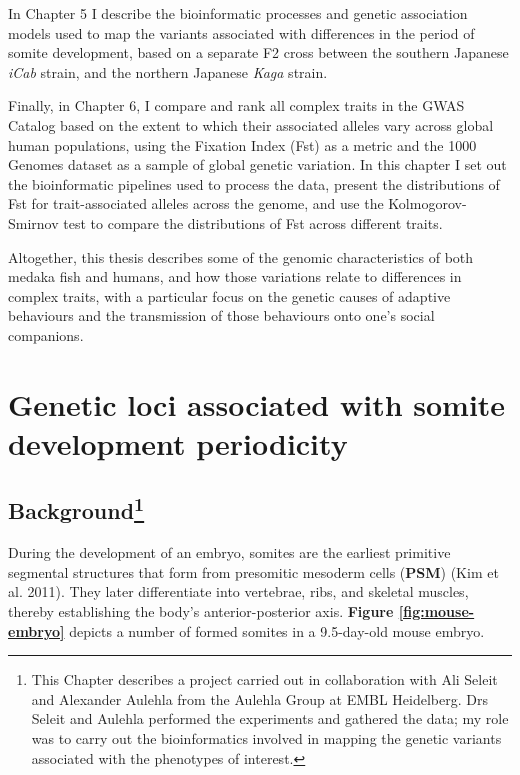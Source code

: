 \documentclass[
]{book}
\begin{document}
In Chapter 5 I describe the bioinformatic processes and genetic association models used to map the variants associated with differences in the period of somite development, based on a separate F2 cross between the southern Japanese \emph{iCab} strain, and the northern Japanese \emph{Kaga} strain.

Finally, in Chapter 6, I compare and rank all complex traits in the GWAS Catalog based on the extent to which their associated alleles vary across global human populations, using the Fixation Index (Fst) as a metric and the 1000 Genomes dataset as a sample of global genetic variation. In this chapter I set out the bioinformatic pipelines used to process the data, present the distributions of Fst for trait-associated alleles across the genome, and use the Kolmogorov-Smirnov test to compare the distributions of Fst across different traits.

Altogether, this thesis describes some of the genomic characteristics of both medaka fish and humans, and how those variations relate to differences in complex traits, with a particular focus on the genetic causes of adaptive behaviours and the transmission of those behaviours onto one's social companions.

\hypertarget{Somite-chap}{%
\chapter{Genetic loci associated with somite development periodicity}\label{Somite-chap}}


\hypertarget{background}{%
\section[Background]{\texorpdfstring{Background\footnote{This Chapter describes a project carried out in collaboration with Ali Seleit and Alexander Aulehla from the Aulehla Group at EMBL Heidelberg. Drs Seleit and Aulehla performed the experiments and gathered the data; my role was to carry out the bioinformatics involved in mapping the genetic variants associated with the phenotypes of interest.}}{Background}}\label{background}}

During the development of an embryo, somites are the earliest primitive segmental structures that form from presomitic mesoderm cells (\textbf{PSM}) (Kim et al. 2011). They later differentiate into vertebrae, ribs, and skeletal muscles, thereby establishing the body's anterior-posterior axis. \textbf{Figure \ref{fig:mouse-embryo}} depicts a number of formed somites in a 9.5-day-old mouse embryo.
\end{document}

